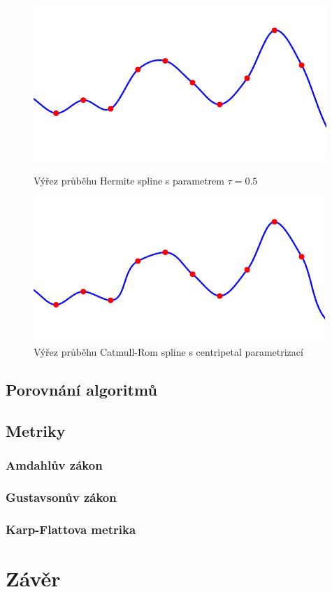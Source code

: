 \documentclass[]{thesiskiv}
\begin{document}
\begin{figure}
\begin{minipage}[ht]{0.65\textwidth}
	\includegraphics[width=\linewidth]{img/sample-hermite.png}
	\caption{Výřez průběhu Hermite spline s parametrem $\tau = 0.5$}
\end{minipage}

\begin{minipage}[ht]{0.65\textwidth}
	\includegraphics[width=\linewidth]{img/sample-catmullrom.png}
	\caption{Výřez průběhu Catmull-Rom spline s centripetal parametrizací}
\end{minipage}

\end{figure}



\section{Porovnání algoritmů}

\section{Metriky}

\subsection{Amdahlův zákon}

\subsection{Gustavsonův zákon}

\subsection{Karp-Flattova metrika}




\chapter{Závěr}
\end{document}
